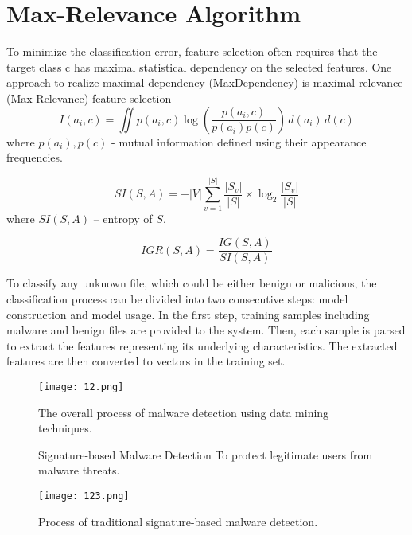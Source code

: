 \documentclass[a4paper, 12pt, oneside]{Thesis}
\begin{document}
\section{Max-Relevance Algorithm}

To minimize the classification error, feature selection often requires that the target class c has maximal statistical dependency on the selected features. One approach to realize maximal dependency (MaxDependency) is maximal relevance (Max-Relevance) feature selection
\begin{equation}
I(a_i, c) = \iint p(a_i, c) \log \left( \frac{p(a_i, c)}{p(a_i) p(c)} \right) \, d(a_i) \, d(c)
\label{mutual_information}
\end{equation}
where \( p(a_i), p(c) \) - mutual information defined using their appearance frequencies.

\begin{equation}
SI(S, A) = - \left| V \right| \sum_{v=1}^{\left| S \right|} \frac{\left| S_v \right|}{\left| S \right|} \times \log_2 \frac{\left| S_v \right|}{\left| S \right|}
\label{entropy}
\end{equation}
where \( SI(S, A) \) – entropy of \( S \).

\begin{equation}
IGR(S, A) = \frac{IG(S, A)}{SI(S, A)}
\label{igr}
\end{equation}

To classify any unknown file, which could be either benign or malicious, the classification process can be divided into two consecutive steps: model construction and model usage. In the first step, training samples including malware and benign files are provided to the system. Then, each sample is parsed to extract the features representing its underlying characteristics. The extracted features are then converted to vectors in the training set.
\begin{figure}[h]
    \centering
    \texttt{[image: 12.png]} 
    \caption{The overall process of malware detection using data mining techniques.}
    \label{sample_image}
\end{figure}
\begin{figure}[h]
    \text Signature-based Malware Detection To protect legitimate users from malware threats.
    \par
    \centering
    \texttt{[image: 123.png]} 
    \caption{Process of traditional signature-based malware detection.}
    \label{sample_image1}
\end{figure}
\end{document}
